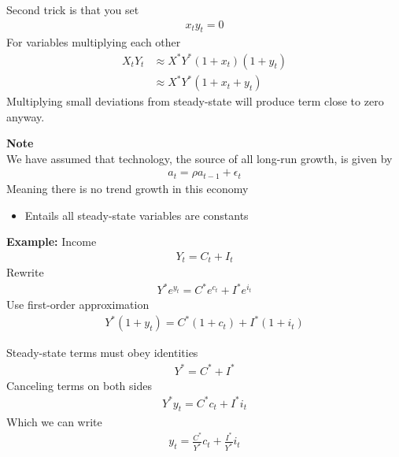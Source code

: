 \documentclass{beamer}
\begin{document}
\begin{frame}
  Second trick is that you set 
 \begin{align}
   x_ty_t=0
 \end{align}
  \medskip
  For variables multiplying each other  
\begin{align}
  X_tY_t &\approx X^*Y^*(1+x_t)(1+y_t) \\
  &\approx X^*Y^*(1+x_t+y_t)
\end{align}
\medskip
Multiplying small deviations from steady-state will produce term close to zero anyway.
\end{frame}

\begin{frame}
  \textbf{Note}\\
  We have assumed that technology, the source of all long-run growth, is given by
  \begin{align}
    a_t=\rho a_{t-1} + \epsilon_t
  \end{align}
  \medskip
  Meaning there is no trend growth in this economy
  \begin{itemize}
    \item Entails all steady-state variables are constants
  \end{itemize}
\end{frame}

\begin{frame}
 \textbf{Example:} Income
  \begin{align} 
    Y_t=C_t+I_t 
  \end{align}
  \medskip
  Rewrite
 \begin{align} 
    Y^*e^{y_t}=C^*e^{c_t}+I^*e^{i_t} 
  \end{align}
  \medskip
  Use first-order approximation
 \begin{align} 
    Y^*(1+y_t) = C^*(1+c_t) + I^*(1+i_t) 
 \end{align}
\end{frame}

\begin{frame}
  Steady-state terms must obey identities
  \begin{align} 
     Y^* = C^* + I^* 
  \end{align}
  \medskip
  Canceling terms on both sides
 \begin{align} 
     Y^*y_t = C^*c_t + I^*i_t 
  \end{align}
  \medskip
  Which we can write
  \begin{align} 
     y_t=\frac{C^*}{Y^*}c_t+\frac{I^*}{Y^*}i_t 
  \end{align}
\end{frame}
\end{document}

